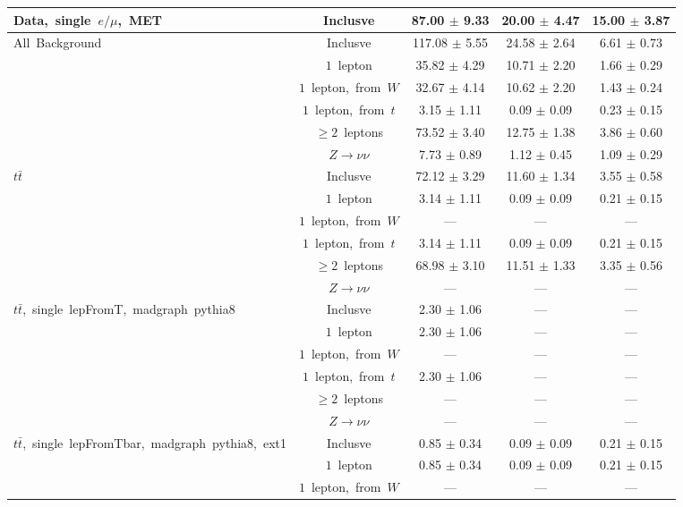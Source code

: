 \documentclass{article}
\begin{document}
\begin{longtable}{|l|c|c|c|c|}
\multirow{1}{*}{Data,~single~$e/\mu$,~MET} & Inclusve  & 87.00 $\pm$ 9.33  & 20.00 $\pm$ 4.47  & 15.00 $\pm$ 3.87 \\* 
\hline \hline 
\multirow{6}{*}{All~Background} & Inclusve  & 117.08 $\pm$ 5.55  & 24.58 $\pm$ 2.64  & 6.61 $\pm$ 0.73 \\* 
 & $1$~lepton  & 35.82 $\pm$ 4.29  & 10.71 $\pm$ 2.20  & 1.66 $\pm$ 0.29 \\* 
 & $1$~lepton,~from~$W$  & 32.67 $\pm$ 4.14  & 10.62 $\pm$ 2.20  & 1.43 $\pm$ 0.24 \\* 
 & $1$~lepton,~from~$t$  & 3.15 $\pm$ 1.11  & 0.09 $\pm$ 0.09  & 0.23 $\pm$ 0.15 \\* 
 & $\ge2$~leptons  & 73.52 $\pm$ 3.40  & 12.75 $\pm$ 1.38  & 3.86 $\pm$ 0.60 \\* 
 & $Z\rightarrow\nu\nu$  & 7.73 $\pm$ 0.89  & 1.12 $\pm$ 0.45  & 1.09 $\pm$ 0.29 \\* 
\hline 
\multirow{6}{*}{$t\bar{t}$} & Inclusve  & 72.12 $\pm$ 3.29  & 11.60 $\pm$ 1.34  & 3.55 $\pm$ 0.58 \\* 
 & $1$~lepton  & 3.14 $\pm$ 1.11  & 0.09 $\pm$ 0.09  & 0.21 $\pm$ 0.15 \\* 
 & $1$~lepton,~from~$W$  & ---  & ---  & --- \\* 
 & $1$~lepton,~from~$t$  & 3.14 $\pm$ 1.11  & 0.09 $\pm$ 0.09  & 0.21 $\pm$ 0.15 \\* 
 & $\ge2$~leptons  & 68.98 $\pm$ 3.10  & 11.51 $\pm$ 1.33  & 3.35 $\pm$ 0.56 \\* 
 & $Z\rightarrow\nu\nu$  & ---  & ---  & --- \\* 
\hline 
\multirow{6}{*}{$t\bar{t}$,~single~lepFromT,~madgraph~pythia8} & Inclusve  & 2.30 $\pm$ 1.06  & ---  & --- \\* 
 & $1$~lepton  & 2.30 $\pm$ 1.06  & ---  & --- \\* 
 & $1$~lepton,~from~$W$  & ---  & ---  & --- \\* 
 & $1$~lepton,~from~$t$  & 2.30 $\pm$ 1.06  & ---  & --- \\* 
 & $\ge2$~leptons  & ---  & ---  & --- \\* 
 & $Z\rightarrow\nu\nu$  & ---  & ---  & --- \\* 
\hline 
\multirow{6}{*}{$t\bar{t}$,~single~lepFromTbar,~madgraph~pythia8,~ext1} & Inclusve  & 0.85 $\pm$ 0.34  & 0.09 $\pm$ 0.09  & 0.21 $\pm$ 0.15 \\* 
 & $1$~lepton  & 0.85 $\pm$ 0.34  & 0.09 $\pm$ 0.09  & 0.21 $\pm$ 0.15 \\* 
 & $1$~lepton,~from~$W$  & ---  & ---  & --- \\* 

\end{longtable}
\end{document}
